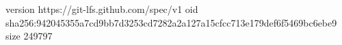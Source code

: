 version https://git-lfs.github.com/spec/v1
oid sha256:942045355a7cd9bb7d3253cd7282a2a127a15cfcc713e179def6f5469bc6ebe9
size 249797
